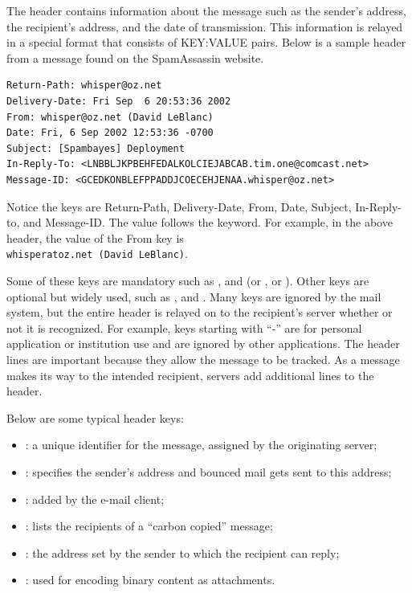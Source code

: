 The header contains information about the message such as
the sender's address, the recipient's address, and the date of 
transmission.
This information is relayed in a special format 
that consists of  KEY:VALUE pairs.
Below is a sample header from a message found on the
SpamAssassin website.

\begin{verbatim}
Return-Path: whisper@oz.net
Delivery-Date: Fri Sep  6 20:53:36 2002
From: whisper@oz.net (David LeBlanc)
Date: Fri, 6 Sep 2002 12:53:36 -0700
Subject: [Spambayes] Deployment
In-Reply-To: <LNBBLJKPBEHFEDALKOLCIEJABCAB.tim.one@comcast.net>
Message-ID: <GCEDKONBLEFPPADDJCOECEHJENAA.whisper@oz.net>
\end{verbatim}
                                                                               
Notice the keys are Return-Path, Delivery-Date, From, Date,
Subject, In-Reply-to, and Message-ID. 
The value follows the keyword.
For example, in the above header, the value of the From key 
is \\
\texttt{whisper{at}oz.net (David LeBlanc)}.

Some of these keys are mandatory such as , and  
(or , or ).
Other keys are optional but widely used, such as , and .
Many keys are ignored by the mail system, but the entire header 
is relayed on to the recipient's server whether or not it is 
recognized. 
For example, keys starting with ``-'' are for personal application 
or institution use and are ignored by other applications.
The  header lines are important because they allow
the message to be tracked. As a message makes its way to the
intended recipient, servers add additional  lines
to the header. 


Below are some typical header keys:

\begin{itemize}
\item {}: a unique identifier for the message, assigned by the 
originating server; 
\item {}: specifies the sender's address and  
        bounced mail gets sent to this address;
\item {}: added by the e-mail client;
\item {}: lists the recipients of a ``carbon copied'' message;
\item {}: the address set by the sender to which the 
recipient can reply; 
\item {}: used for encoding binary content as attachments.
\end{itemize}

